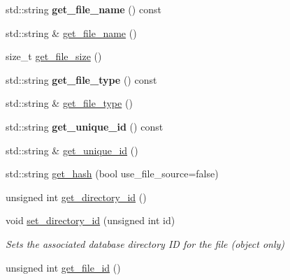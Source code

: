 \begin{DoxyCompactItemize}
\mbox{\label{class_backup_1_1_file_1_1_backup_file_ac2b2bd4f4505e52368a2f4200a8795fa}} 
std\+::string {\bfseries get\+\_\+file\+\_\+name} () const
\item 
std\+::string \& \hyperlink{class_backup_1_1_file_1_1_backup_file_a0c5a9b6169c5724e97904de8b1f6c95c}{get\+\_\+file\+\_\+name} ()
\item 
size\+\_\+t \hyperlink{class_backup_1_1_file_1_1_backup_file_a482909cefc3cf777657a2500a7fd8c47}{get\+\_\+file\+\_\+size} ()
\item 
\mbox{\label{class_backup_1_1_file_1_1_backup_file_af258fa0452d1ab95c69786e8c0516466}} 
std\+::string {\bfseries get\+\_\+file\+\_\+type} () const
\item 
std\+::string \& \hyperlink{class_backup_1_1_file_1_1_backup_file_abc2a8b1743ceb5b1ce8a7a9ce7967804}{get\+\_\+file\+\_\+type} ()
\item 
\mbox{\label{class_backup_1_1_file_1_1_backup_file_a168de9c6391d4424e5b61f7813bdddbf}} 
std\+::string {\bfseries get\+\_\+unique\+\_\+id} () const
\item 
std\+::string \& \hyperlink{class_backup_1_1_file_1_1_backup_file_adc5feacc7ab47c0761b807c389bdef86}{get\+\_\+unique\+\_\+id} ()
\item 
std\+::string \hyperlink{class_backup_1_1_file_1_1_backup_file_ac799d37d7332c16e10c660123dadc30a}{get\+\_\+hash} (bool use\+\_\+file\+\_\+source=false)
\item 
unsigned int \hyperlink{class_backup_1_1_file_1_1_backup_file_ada76c8701596d88b1c12fefe7687c5b4}{get\+\_\+directory\+\_\+id} ()
\item 
\mbox{\label{class_backup_1_1_file_1_1_backup_file_a656f2a4a6b59de41c9cc5135cbe0909f}} 
void \hyperlink{class_backup_1_1_file_1_1_backup_file_a656f2a4a6b59de41c9cc5135cbe0909f}{set\+\_\+directory\+\_\+id} (unsigned int id)
\begin{DoxyCompactList}\small\item\em Sets the associated database directory ID for the file (object only) \end{DoxyCompactList}\item 
unsigned int \hyperlink{class_backup_1_1_file_1_1_backup_file_a53e76e663bc651d68cfa9010788fee99}{get\+\_\+file\+\_\+id} ()

\end{DoxyCompactItemize}
